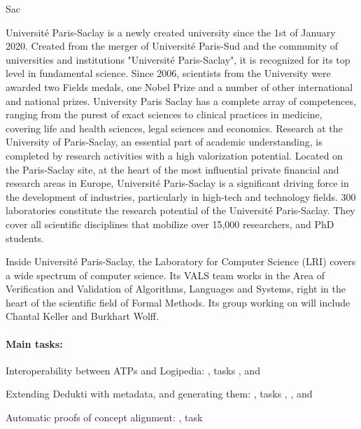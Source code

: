 \begin{sitedescription}{Sac}


Université Paris-Saclay is a newly created university since the 1st of
January 2020. Created from the merger of Université Paris-Sud and the
community of universities and institutions "Université Paris-Saclay", it
is recognized for its top level in fundamental science.  Since 2006,
scientists from the University were awarded two Fields medals, one Nobel
Prize and a number of other international and national prizes.
University Paris Saclay has a complete array of competences, ranging
from the purest of exact sciences to clinical practices in medicine,
covering life and health sciences, legal sciences and economics.
Research at the University of Paris-Saclay, an essential part of
academic understanding, is completed by research activities with a high
valorization potential. Located on the Paris-Saclay site, at the heart
of the most influential private financial and research areas in Europe,
Université Paris-Saclay is a significant driving force in the
development of industries, particularly in high-tech and technology
fields. 300 laboratories constitute the research potential of the
Université Paris-Saclay. They cover all scientific disciplines that
mobilize over 15,000 researchers, and PhD students.

Inside Université Paris-Saclay, the Laboratory for Computer Science
(LRI) covers a wide spectrum of computer science. Its VALS team works in
the Area of Verification and Validation of Algorithms, Languages and
Systems, right in the heart of the scientific field of Formal Methods.
Its group working on \pn will include Chantal Keller and Burkhart Wolff.

\paragraph{Main tasks:}

\begin{compactitem}
\item Interoperability between ATPs and Logipedia: , tasks
  ,  and
\item Extending Dedukti with metadata, and generating them:
  , tasks ,
  ,  and
\item Automatic proofs of concept alignment: , task
\end{compactitem}


\end{sitedescription}

